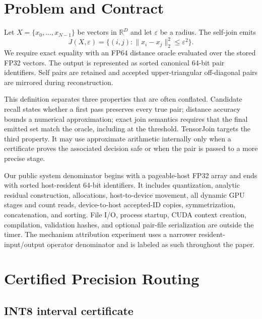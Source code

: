 \documentclass[sigconf,review,anonymous]{acmart}
\newcommand{\system}{TensorJoin\xspace}
\begin{document}
\section{Problem and Contract}

Let $X=\{x_0,\ldots,x_{N-1}\}$ be vectors in $\mathbb{R}^{D}$ and let
$\varepsilon$ be a radius.  The self-join emits
\begin{equation}
  J(X,\varepsilon)=\{(i,j):\lVert x_i-x_j\rVert_2^2\leq\varepsilon^2\}.
\end{equation}
We require exact equality with an FP64 distance oracle evaluated over the
stored FP32 vectors.  The output is represented as sorted canonical 64-bit
pair identifiers.  Self pairs are retained and accepted upper-triangular
off-diagonal pairs are mirrored during reconstruction.

This definition separates three properties that are often conflated.
Candidate recall states whether a first pass preserves every true pair;
distance accuracy bounds a numerical approximation; exact join semantics
requires that the final emitted set match the oracle, including at the
threshold.  \system targets the third property.  It may use approximate
arithmetic internally only when a certificate proves the associated decision
safe or when the pair is passed to a more precise stage.

Our public system denominator begins with a pageable-host FP32 array and ends
with sorted host-resident 64-bit identifiers.  It includes quantization,
analytic residual construction, allocations, host-to-device movement, all
dynamic GPU stages and count reads, device-to-host accepted-ID copies,
symmetrization, concatenation, and sorting.  File I/O, process startup, CUDA
context creation, compilation, validation hashes, and optional pair-file
serialization are outside the timer.  The mechanism attribution experiment
uses a narrower resident-input/output operator denominator and is labeled as
such throughout the paper.

\section{Certified Precision Routing}

\subsection{INT8 interval certificate}
\end{document}
